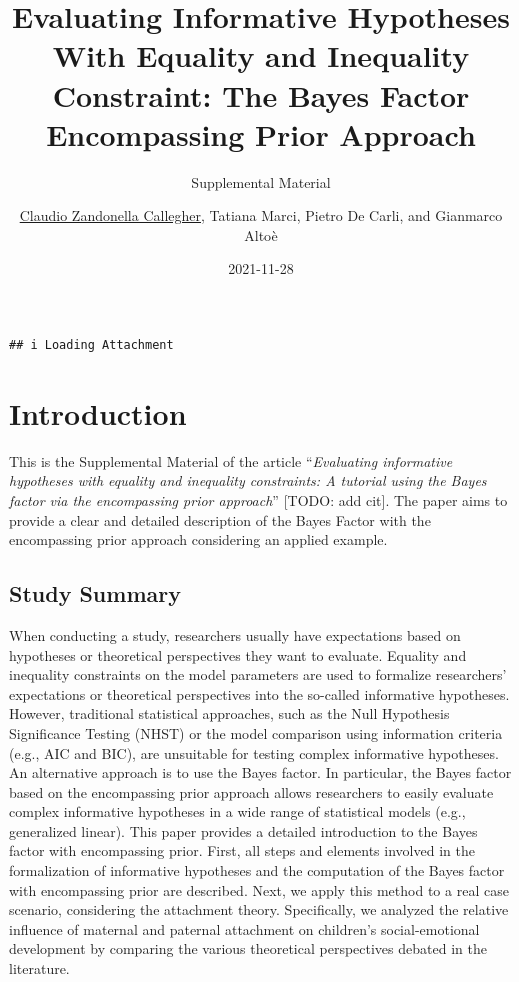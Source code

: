 \documentclass[
]{book}
\title{Evaluating Informative Hypotheses With Equality and Inequality Constraint: The Bayes Factor Encompassing Prior Approach}
\subtitle{Supplemental Material}
\author{\href{https://claudiozandonella.netlify.app/}{Claudio Zandonella Callegher}, Tatiana Marci, Pietro De Carli, and Gianmarco Altoè}
\date{2021-11-28}
\begin{document}
\maketitle

{
\setcounter{tocdepth}{1}
\tableofcontents
}
\begin{verbatim}
## i Loading Attachment
\end{verbatim}

\hypertarget{introduction}{%
\chapter*{Introduction}\label{introduction}}

This is the Supplemental Material of the article ``\emph{Evaluating informative hypotheses with equality and inequality constraints: A tutorial using the Bayes factor via the encompassing prior approach}'' {[}TODO: add cit{]}. The paper aims to provide a clear and detailed description of the Bayes Factor with the encompassing prior approach considering an applied example.

\hypertarget{study-summary}{%
\section*{Study Summary}\label{study-summary}}

When conducting a study, researchers usually have expectations based on hypotheses or theoretical perspectives they want to evaluate. Equality and inequality constraints on the model parameters are used to formalize researchers' expectations or theoretical perspectives into the so-called informative hypotheses. However, traditional statistical approaches, such as the Null Hypothesis Significance Testing (NHST) or the model comparison using information criteria (e.g., AIC and BIC), are unsuitable for testing complex informative hypotheses. An alternative approach is to use the Bayes factor. In particular, the Bayes factor based on the encompassing prior approach allows researchers to easily evaluate complex informative hypotheses in a wide range of statistical models (e.g., generalized linear). This paper provides a detailed introduction to the Bayes factor with encompassing prior. First, all steps and elements involved in the formalization of informative hypotheses and the computation of the Bayes factor with encompassing prior are described. Next, we apply this method to a real case scenario, considering the attachment theory. Specifically, we analyzed the relative influence of maternal and paternal attachment on children's social-emotional development by comparing the various theoretical perspectives debated in the literature.
\end{document}
